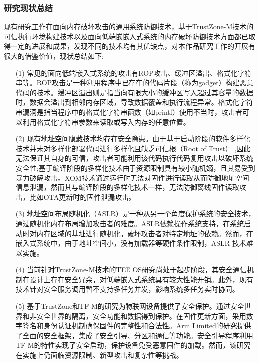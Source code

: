 \documentclass[UTF8,12pt,a4paper]{ctexart}
\numberwithin{figure}{section}
\begin{document}
\subsubsection{研究现状总结}
\par 现有研究工作在面向内存破坏攻击的通用系统防御技术，基于TrustZone-M技术的可信执行环境构建技术以及面向低端嵌嵌入式系统的内存破坏防御技术方面都已取得一定的进展和成果，发现不同的技术均有其优缺点，对本作品研究工作的开展有很大的借鉴价值，现状总结如下:
\begin{itemize}
    \item[(1)]常见的面向低端嵌入式系统的攻击有ROP攻击、缓冲区溢出、格式化字符串等。ROP攻击是一种利用程序中已存在的代码片段（称为gadget）构建恶意代码的技术。缓冲区溢出则是指当向有限大小的缓冲区写入超过其容量的数据时，数据会溢出到相邻内存区域，导致数据覆盖和执行流程异常。格式化字符串漏洞是指当程序中的格式化字符串函数（如printf）使用不当时，攻击者可以利用格式化字符串参数来读取或写入内存的任意位置。
    \item[(2)] 现有地址空间隐藏技术均存在安全隐患。由于基于启动阶段的软件多样化技术并未对多样化部署代码进行多样化且缺乏可信根（Root of Trust） ,因此无法保证其自身的可信，攻击者可能利用该代码执行代码复用攻击以破坏系统安全性;基于编译阶段的多样化技术由于资源限制具有较小随机嫡，且其易受到暴力破解攻击。XOM技术通过运行时无法对固件进行读取从而防御地址空间信息泄漏，然而其与编译阶段的多样化技术一样，无法防御离线固件读取攻击，比如OTA更新时的固件泄漏攻击。
    \item[(3)] 地址空间布局随机化（ASLR）是一种从另一个角度保护系统的安全技术，通过随机化内存布局增加攻击者的难度。ASLR依赖操作系统支持，在系统启动时对内存区域的基址进行随机化，破坏攻击者对特定地址的依赖。然而，在嵌入式系统中，由于地址空间小，没有加载器等硬件条件限制，ASLR 技术难以实施。
    \item[(4)] 当前针对TrustZone-M技术的TEE OS研究尚处于起步阶段，其安全通信机制在设计上存在安全冗余，对低端嵌入式系统具有较大性能开销。此外，现有技术针对安全服务调用暂不支持多任务并发，影响系统多任务实时协同。
    \item[(5)] 基于TrustZone和TF-M的研究为物联网设备提供了安全保护。通过安全世界和非安全世界的隔离，安全功能和数据得到保护。在固件更新方面，采用数字签名和身份认证机制确保固件的完整性和合法性。Arm Limited的研究提供了全面的安全框架，集成了安全引导、分区和通信等功能。安全引导程序利用TF-M的特性实现了安全启动，保护设备免受恶意固件的加载。然而，该研究在实施上仍面临资源限制、新型攻击和复杂性等挑战。
\end{itemize}
\end{document}
